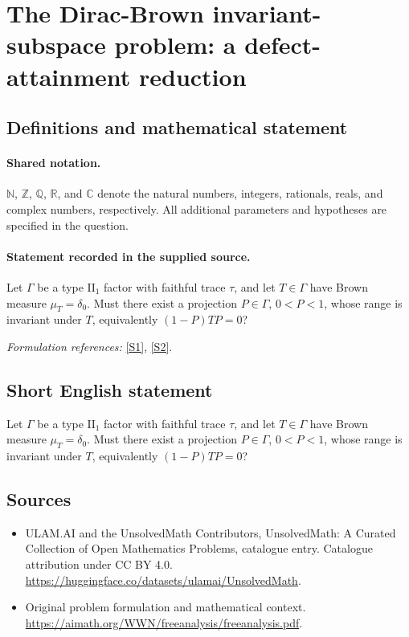 \documentclass[11pt]{article}
\newcommand{\sref}[2]{\hyperlink{source:#1:#2}{[S#2]}}
\begin{document}
\section{The Dirac-Brown invariant-subspace problem: a defect-attainment reduction}\label{statement}

\subsection{Definitions and mathematical statement}

\paragraph{Shared notation.}$\mathbb N$, $\mathbb Z$, $\mathbb Q$, $\mathbb R$, and $\mathbb C$ denote the natural numbers, integers, rationals, reals, and complex numbers, respectively. All additional parameters and hypotheses are specified in the question.


\paragraph{Statement recorded in the supplied source.}
Let $\Gamma$ be a type $\mathrm{II}_1$ factor with faithful trace $\tau$, and let $T\in\Gamma$ have Brown measure $\mu_T=\delta_0$. Must there exist a projection $P\in\Gamma$, $0<P<1$, whose range is invariant under $T$, equivalently $(1-P)TP=0$?
\par\smallskip\textit{Formulation references:} \sref{statement}{1}, \sref{statement}{2}.
\subsection{Short English statement}
Let $\Gamma$ be a type $\mathrm{II}_1$ factor with faithful trace $\tau$, and let $T\in\Gamma$ have Brown measure $\mu_T=\delta_0$. Must there exist a projection $P\in\Gamma$, $0<P<1$, whose range is invariant under $T$, equivalently $(1-P)TP=0$?
\subsection{Sources}
\begin{itemize}
\item[\hypertarget{source:statement:1}{S1}] ULAM.AI and the UnsolvedMath Contributors, UnsolvedMath: A Curated Collection of Open Mathematics Problems, catalogue entry. Catalogue attribution under CC BY 4.0.
\url{https://huggingface.co/datasets/ulamai/UnsolvedMath}.
\item[\hypertarget{source:statement:2}{S2}] Original problem formulation and mathematical context.
\url{https://aimath.org/WWN/freeanalysis/freeanalysis.pdf}.
\end{itemize}
\label{end:statement}
\end{document}
